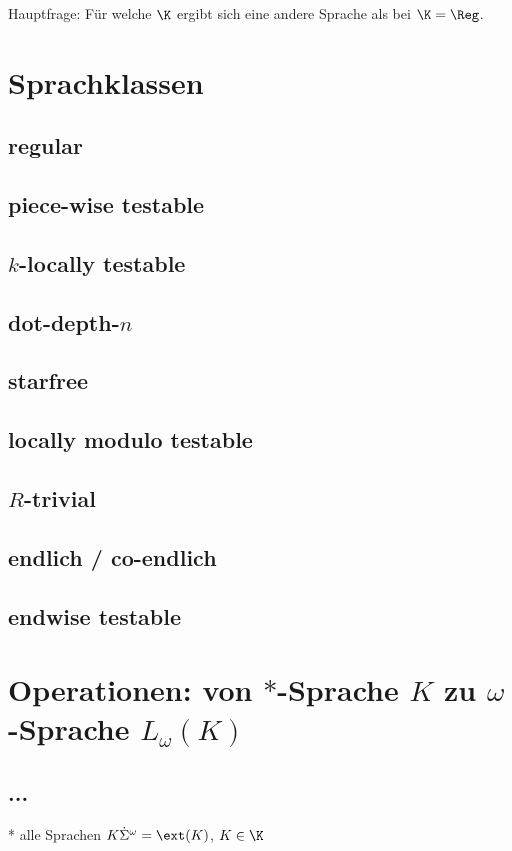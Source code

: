 

Hauptfrage: Für welche $\K$ ergibt sich eine andere Sprache als bei $\K = \Reg$.

\section{Sprachklassen}
\subsection{regular}
\subsection{piece-wise testable}
\subsection{$k$-locally testable}
\subsection{dot-depth-$n$}
\subsection{starfree}
\subsection{locally modulo testable}
\subsection{$R$-trivial}
\subsection{endlich / co-endlich}
\subsection{endwise testable}

\section{Operationen: von $*$-Sprache $K$ zu $\omega$-Sprache $L_\omega (K)$}
\subsection{...}

* alle Sprachen $K \dot \Sigma^\omega = \ext(K)$, $K \in \K$

